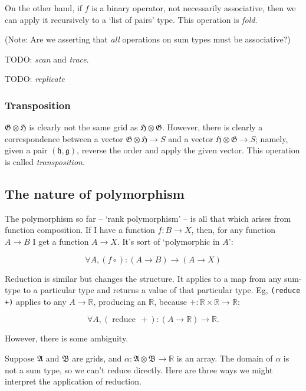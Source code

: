 \documentclass[11pt]{article}
\newcommand{\gr}[1]{\mathfrak{#1}}
\newcommand{\R}{\mathbb{R}}
\begin{document}
On the other hand, if \(f\) is a binary operator, not necessarily associative,
then we can apply it recursively to a ‘list of pairs’ type. This operation is
\emph{fold}.

(Note: Are we asserting that \emph{all} operations on sum types must be associative?)

TODO: \emph{scan} and \emph{trace}. 

TODO: \emph{replicate}

\subsubsection{Transposition}
\label{sec:org68e418b}

\(\gr{G}\otimes\gr{H}\) is clearly not the same grid as
\(\gr{H}\otimes\gr{G}\). However, there is clearly a correspondence between a
vector \(\gr{G}\otimes\gr{H}\to S\) and a vector \(\gr{H}\otimes\gr{G}\to
S\); namely, given a pair \((\gr{h}, \gr{g})\), reverse the order and apply the
given vector. This operation is called \emph{transposition}. 

\subsection{The nature of polymorphism}
\label{sec:orgd61f222}

The polymorphism so far -- ‘rank polymorphism’ -- is all that which arises from
function composition. If I have a function \(f:B\to X\), then, for any function
\(A\to B\) I get a function \(A\to X\). It's sort of ‘polymorphic in \(A\)’:

$$
\forall A, (f\circ) : (A\to B)\to (A\to X)
$$

Reduction is similar but changes the structure. It applies to a map from any
sum-type to a particular type and returns a value of that particular type. Eg,
\texttt{(reduce +)} applies to any \(A\to\R\), producing an \(\R\), because
\(+:\R\times\R\to\R\):

$$
\forall A, (\operatorname{reduce}\, +) : (A \to \R)\to \R.
$$

However, there is some ambiguity. 

Suppose \(\gr{A}\) and \(\gr{B}\) are grids, and \(\alpha : \gr{A}\otimes\gr{B}\to\R\)
is an array. The domain of \(\alpha\) is not a sum type, so we can't reduce
directly. Here are three ways we might interpret the application of reduction. 
\end{document}
